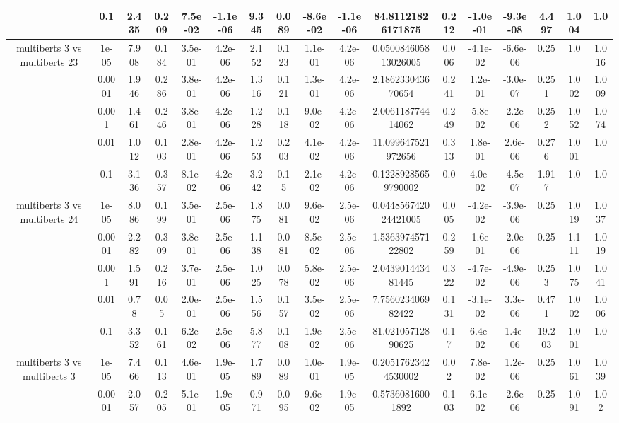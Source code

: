 \begin{tabular}{|c|c|c|c|c|c|c|c|c|c|c|c|c|c|c|c|c|}
 & 0.1 & 2.435 & 0.209 & 7.5e-02 & -1.1e-06 & 9.345 & 0.089 & -8.6e-02 & -1.1e-06 & 84.81121826171875 & 0.212 & -1.0e-01 & -9.3e-08 & 4.497 & 1.004 & 1.0 \\
\hline
\multirow{5}{*}{multiberts 3 vs multiberts 23} & 1e-05 & 7.908 & 0.184 & 3.5e-01 & 4.2e-06 & 2.152 & 0.123 & 1.1e-01 & 4.2e-06 & 0.050084605813026005 & 0.006 & -4.1e-02 & -6.6e-06 & 0.25 & 1.0 & 1.016 \\
 & 0.0001 & 1.946 & 0.286 & 3.8e-01 & 4.2e-06 & 1.316 & 0.121 & 1.3e-01 & 4.2e-06 & 2.186233043670654 & 0.241 & 1.2e-01 & -3.0e-07 & 0.251 & 1.002 & 1.009 \\
 & 0.001 & 1.461 & 0.246 & 3.8e-01 & 4.2e-06 & 1.228 & 0.118 & 9.0e-02 & 4.2e-06 & 2.006118774414062 & 0.249 & -5.8e-02 & -2.2e-06 & 0.252 & 1.052 & 1.074 \\
 & 0.01 & 1.012 & 0.103 & 2.8e-01 & 4.2e-06 & 1.253 & 0.203 & 4.1e-02 & 4.2e-06 & 11.099647521972656 & 0.313 & 1.8e-01 & 2.6e-06 & 0.276 & 1.001 & 1.0 \\
 & 0.1 & 3.136 & 0.357 & 8.1e-02 & 4.2e-06 & 3.242 & 0.15 & 2.1e-02 & 4.2e-06 & 0.12289285659790002 & 0.0 & 4.0e-02 & -4.5e-07 & 1.917 & 1.0 & 1.0 \\
\hline
\multirow{5}{*}{multiberts 3 vs multiberts 24} & 1e-05 & 8.086 & 0.199 & 3.5e-01 & 2.5e-06 & 1.875 & 0.081 & 9.6e-02 & 2.5e-06 & 0.044856742024421005 & 0.005 & -4.2e-02 & -3.9e-06 & 0.25 & 1.019 & 1.037 \\
 & 0.0001 & 2.282 & 0.309 & 3.8e-01 & 2.5e-06 & 1.138 & 0.081 & 8.5e-02 & 2.5e-06 & 1.536397457122802 & 0.259 & -1.6e-01 & -2.0e-06 & 0.25 & 1.111 & 1.019 \\
 & 0.001 & 1.591 & 0.216 & 3.7e-01 & 2.5e-06 & 1.025 & 0.078 & 5.8e-02 & 2.5e-06 & 2.043901443481445 & 0.322 & -4.7e-02 & -4.9e-06 & 0.253 & 1.075 & 1.041 \\
 & 0.01 & 0.78 & 0.05 & 2.0e-01 & 2.5e-06 & 1.556 & 0.157 & 3.5e-02 & 2.5e-06 & 7.756023406982422 & 0.131 & -3.1e-02 & 3.3e-06 & 0.471 & 1.002 & 1.006 \\
 & 0.1 & 3.352 & 0.161 & 6.2e-02 & 2.5e-06 & 5.877 & 0.108 & 1.9e-02 & 2.5e-06 & 81.02105712890625 & 0.17 & 6.4e-02 & 1.4e-06 & 19.203 & 1.001 & 1.0 \\
\hline
\multirow{5}{*}{multiberts 3 vs multiberts 3} & 1e-05 & 7.466 & 0.113 & 4.6e-01 & 1.9e-05 & 1.789 & 0.089 & 1.0e-01 & 1.9e-05 & 0.20517623424530002 & 0.02 & 7.8e-02 & 1.2e-06 & 0.25 & 1.061 & 1.039 \\
 & 0.0001 & 2.057 & 0.205 & 5.1e-01 & 1.9e-05 & 0.971 & 0.095 & 9.6e-02 & 1.9e-05 & 0.57360816001892 & 0.103 & 6.1e-02 & -2.6e-06 & 0.25 & 1.091 & 1.02 \\

\end{tabular}
